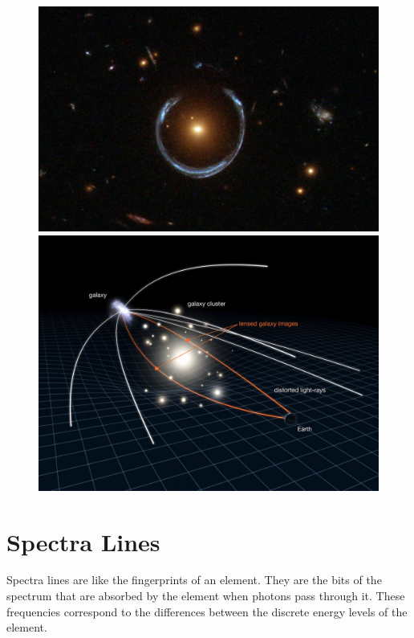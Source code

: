 \documentclass[12pt]{article}
\begin{document}
    \begin{figure}[h]
        \centering
        \includegraphics[scale = 0.2]{A_Horseshoe_Einstein_Ring_from_Hubble.jpg}
        \includegraphics[scale = 0.12]{heic1106c.jpg}
    \end{figure}

    \section*{Spectra Lines}
    Spectra lines are like the fingerprints of an element. They are the bits of the spectrum that are
    absorbed by the element when photons pass through it. These frequencies correspond to the differences
    between the discrete energy levels of the element.
\end{document}
